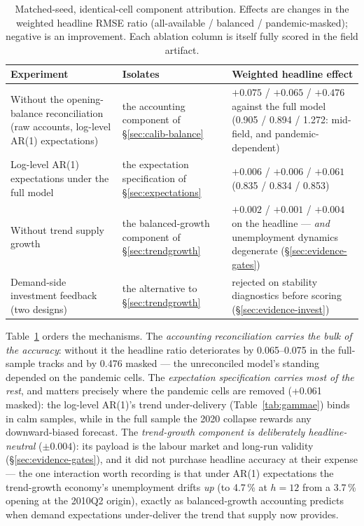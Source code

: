 \documentclass[11pt,a4paper]{article}
\begin{document}
\begin{table}[t]
\centering
\caption{Matched-seed, identical-cell component attribution. Effects are changes in the weighted
headline RMSE ratio (all-available / balanced / pandemic-masked); negative is an improvement.
Each ablation column is itself fully scored in the field artifact.}
\label{tab:attribution}
\footnotesize
\begin{tabular}{@{}p{}p{}p{}@{}}
\toprule
Experiment & Isolates & Weighted headline effect \\
\midrule
Without the opening-balance reconciliation (raw accounts, log-level AR(1) expectations) &
the accounting component of \S\ref{sec:calib-balance} &
$+0.075$ / $+0.065$ / $+0.476$ against the full model
(0.905 / 0.894 / 1.272: mid-field, and pandemic-dependent) \\[2pt]
Log-level AR(1) expectations under the full model &
the expectation specification of \S\ref{sec:expectations} &
$+0.006$ / $+0.006$ / $+0.061$ (0.835 / 0.834 / 0.853) \\[2pt]
Without trend supply growth &
the balanced-growth component of \S\ref{sec:trendgrowth} &
$+0.002$ / $+0.001$ / $+0.004$ on the headline --- \emph{and} unemployment dynamics degenerate
(\S\ref{sec:evidence-gates}) \\[2pt]
Demand-side investment feedback (two designs) &
the alternative to \S\ref{sec:trendgrowth} &
rejected on stability diagnostics before scoring (\S\ref{sec:evidence-invest}) \\
\bottomrule
\end{tabular}
\end{table}

Table~\ref{tab:attribution} orders the mechanisms. The \emph{accounting reconciliation carries
the bulk of the accuracy}: without it the headline ratio deteriorates by 0.065--0.075 in the
full-sample tracks and by 0.476 masked --- the unreconciled model's standing depended on the
pandemic cells. The \emph{expectation specification carries most of the rest}, and matters
precisely where the pandemic cells are removed (+0.061 masked): the log-level AR(1)'s trend
under-delivery (Table~\ref{tab:gammae}) binds in calm samples, while in the full sample the 2020
collapse rewards any downward-biased forecast. The \emph{trend-growth component is deliberately
headline-neutral} ($\pm0.004$): its payload is the labour market and long-run validity
(\S\ref{sec:evidence-gates}), and it did not purchase headline accuracy at their expense --- the
one interaction worth recording is that under AR(1) expectations the trend-growth economy's
unemployment drifts \emph{up} (to 4.7\,\% at $h=12$ from a 3.7\,\% opening at the 2010Q2 origin),
exactly as balanced-growth accounting predicts when demand expectations under-deliver the trend
that supply now provides.
\end{document}
